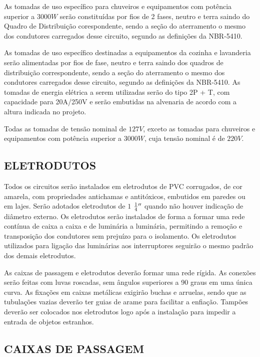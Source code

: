 As tomadas de uso específico para chuveiros e equipamentos com potência superior a $3000W$ serão constituídas por fios de 2 fases, neutro e terra saindo do Quadro de Distribuição corespondente, sendo a seção do aterramento o mesmo dos condutores carregados desse circuito, segundo as definições da NBR-5410. 

As tomadas de uso específico destinadas a equipamentos da cozinha e lavanderia serão alimentadas por fios de fase, neutro e terra saindo dos quadros de distribuição correspondente, sendo a seção do aterramento o mesmo dos condutores carregados desse circuito, segundo as definições da NBR-5410. As tomadas de energia elétrica a serem utilizadas serão do tipo 2P + T, com capacidade para 20A/250V e serão embutidas na alvenaria de acordo com a altura indicada no projeto.

Todas as tomadas de tensão nominal de $127V$, exceto as tomadas para chuveiros e equipamentos com potência superior a $3000W$, cuja tensão nominal é de $220V$.

\subsection{ELETRODUTOS}

Todos os circuitos serão instalados em eletrodutos de PVC corrugados, de cor amarela, com propriedades antichamas e antitóxicos, embutidos em paredes ou em lajes. Serão adotados eletrodutos de $1$ $\frac{1}{4} {}^{\prime\prime}$ quando não houver indicação de diâmetro externo. Os eletrodutos serão instalados de forma a formar uma rede contínua de caixa a caixa e de luminária a luminária, permitindo a remoção e transposição dos condutores sem prejuízo para o isolamento. Os eletrodutos utilizados para ligação das luminárias aos interruptores seguirão o mesmo padrão dos demais eletrodutos.

As caixas de passagem e eletrodutos deverão formar uma rede rígida. As conexões serão feitas com luvas roscadas, sem ângulos superiores a 90 graus em uma única curva. As fixações em caixas metálicas exigirão buchas e arruelas, sendo que as tubulações vazias deverão ter guias de arame para facilitar a enfiação. Tampões deverão ser colocados nos eletrodutos logo após a instalação para impedir a entrada de objetos estranhos.


\subsection{CAIXAS DE PASSAGEM}

